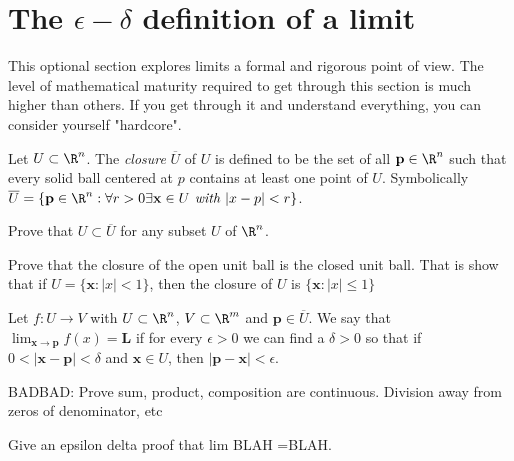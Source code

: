 \section{The $\epsilon -\delta$ definition of a limit}

This optional section explores limits a formal and rigorous point of view.   
The level of mathematical maturity required to get through this section is much higher than others. 
If you get through it and understand everything, you can consider yourself "hardcore".

\begin{definition}
	Let $U \subset \R^n$.  The \textit{closure} $\overline{U}$ of $U$ is defined to be the set of all $\mathbf{p} \in \R^n$ such that
	every solid ball centered at $p$ contains at least one point of $U$.  Symbolically 
	$\overline{U} = \{ \mathbf{p} \in \R^n : \forall r>0 \exists \mathbf{x} \in U \textit{ with } |x-p|<r\}$.
\end{definition}

\begin{question}
Prove that $U \subset \overline{U}$ for any subset $U$ of $\R^n$.
\end{question}

\begin{question}
Prove that the closure of the open unit ball is the closed unit ball.  That is show that if $U = \{\mathbf{x}:|x|<1\}$, then the closure of $U$ is $\{\mathbf{x}:|x|\leq 1\}$
\end{question}

\begin{definition}
	Let $f:U \to  V$  with $U \subset \R^n$, $V \subset \R^m$ and $\mathbf{p} \in \overline{U}$.  We say that $\lim_{\mathbf{x} \to \mathbf{p}}f(x) = \mathbf{L}$ if for every $\epsilon >0$ we can find a 
	$\delta>0$ so that if $0<|\mathbf{x}-\mathbf{p}|<\delta$ and $\mathbf{x} \in U$, then $|\mathbf{p}-\mathbf{x}|<\epsilon$.
\end{definition}

BADBAD: Prove sum, product, composition are continuous.  Division away from zeros of denominator, etc

\begin{question}
Give an epsilon delta proof that lim BLAH =BLAH.
\end{question}
